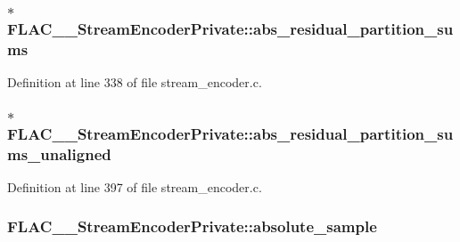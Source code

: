 \subsubsection[{\texorpdfstring{abs\+\_\+residual\+\_\+partition\+\_\+sums}{abs_residual_partition_sums}}]{$\ast$ F\+L\+A\+C\+\_\+\+\_\+\+Stream\+Encoder\+Private\+::abs\+\_\+residual\+\_\+partition\+\_\+sums}\hypertarget{struct_f_l_a_c_____stream_encoder_private_aa63dec17dc75910b274ab8467768f8c6}{}\label{struct_f_l_a_c_____stream_encoder_private_aa63dec17dc75910b274ab8467768f8c6}


Definition at line 338 of file stream\+\_\+encoder.\+c.

\subsubsection[{\texorpdfstring{abs\+\_\+residual\+\_\+partition\+\_\+sums\+\_\+unaligned}{abs_residual_partition_sums_unaligned}}]{$\ast$ F\+L\+A\+C\+\_\+\+\_\+\+Stream\+Encoder\+Private\+::abs\+\_\+residual\+\_\+partition\+\_\+sums\+\_\+unaligned}\hypertarget{struct_f_l_a_c_____stream_encoder_private_a3f44b443c7ace2c39d6a099c1135d7cc}{}\label{struct_f_l_a_c_____stream_encoder_private_a3f44b443c7ace2c39d6a099c1135d7cc}


Definition at line 397 of file stream\+\_\+encoder.\+c.

\subsubsection[{\texorpdfstring{absolute\+\_\+sample}{absolute_sample}}]{ F\+L\+A\+C\+\_\+\+\_\+\+Stream\+Encoder\+Private\+::absolute\+\_\+sample}\hypertarget{struct_f_l_a_c_____stream_encoder_private_ae00280f3e62bdf7601bad7b90c40956c}{}\label{struct_f_l_a_c_____stream_encoder_private_ae00280f3e62bdf7601bad7b90c40956c}


